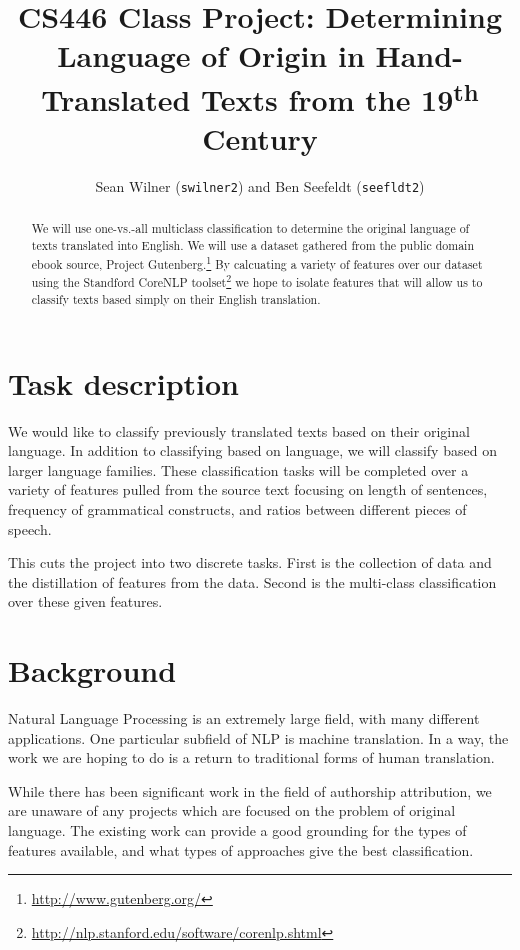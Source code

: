 \documentclass[11pt,letterpaper]{article}
\newcommand{\blue}[1]{\textcolor{RoyalBlue}{#1}}
\newcommand{\instructions}[1]{\blue{\textit{#1}}}
\begin{document}
\title{CS446 Class Project: Determining Language of Origin in Hand-Translated
Texts from the 19\textsuperscript{th} Century}
\author{Sean Wilner ({\tt swilner2}) and Ben Seefeldt ({\tt seefldt2})}
\maketitle



\begin{abstract}
We will use one-vs.-all multiclass classification to determine the original
language of texts translated into English. We will use a dataset gathered from
the public domain ebook source, Project
Gutenberg.\footnote{\url{http://www.gutenberg.org/}} By calcuating a variety of
features over our dataset using the Standford CoreNLP
toolset\footnote{\url{http://nlp.stanford.edu/software/corenlp.shtml}} we hope
to isolate features that will allow us to classify texts based simply on their
English translation.
\end{abstract}

\section*{Task description}
We would like to classify previously translated texts based on their original
language. In addition to classifying based on language, we will classify based
on larger language families. These classification tasks will be completed over a
variety of features pulled from the source text focusing on length of sentences, 
frequency of grammatical constructs, and ratios between different pieces of
speech.

This cuts the project into two discrete tasks. First is the collection of data
and the distillation of features from the data. Second is the multi-class
classification over these given features. 

\section*{Background}
Natural Language Processing is an extremely large field, with many different
applications. One particular subfield of NLP is machine translation. In a way,
the work we are hoping to do is a return to traditional forms of human
translation.

While there has been significant work in the field of authorship attribution,
\cite{one}\cite{two}\cite{three} we are unaware of any projects which are
focused on the problem of original language. The existing work can provide a
good grounding for the types of features available, and what types of approaches
give the best classification.
\end{document}
